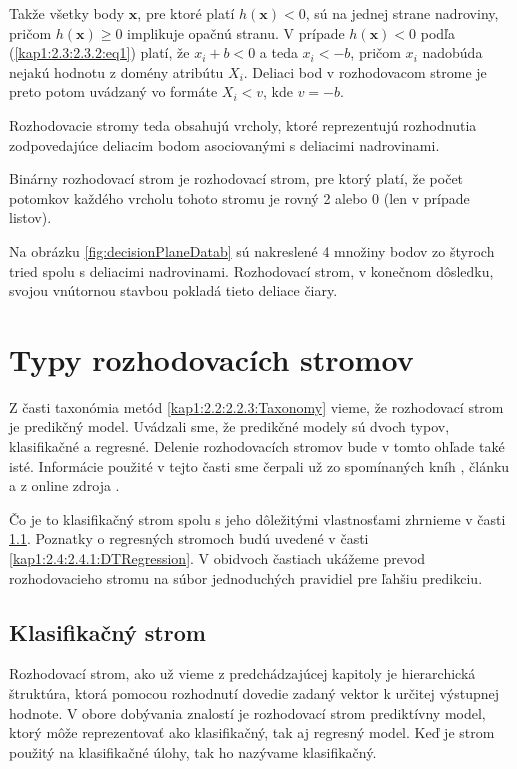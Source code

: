 \begin{remark-sk}\label{kap1:2.3:2.3.2:remarkSplitPoints}
Takže všetky body $\mathbf{x}$, pre ktoré platí $h(\mathbf{x}) < 0$, sú na jednej strane nadroviny, pričom $h(\mathbf{x}) \geq 0$ implikuje opačnú stranu. V prípade $h(\mathbf{x}) < 0$ podľa (\ref{kap1:2.3:2.3.2:eq1}) platí, že $x_{i} + b < 0$ a teda $x_{i} < -b$, pričom $x_{i}$ nadobúda nejakú hodnotu z domény atribútu $X_{i}$. Deliaci bod v rozhodovacom strome je preto potom uvádzaný vo formáte $X_{i} < v$, kde $v = -b$.
\end{remark-sk}

Rozhodovacie stromy teda obsahujú vrcholy, ktoré reprezentujú rozhodnutia zodpovedajúce deliacim bodom asociovanými s deliacimi nadrovinami.

\begin{def-sk}\label{kap1:2.3:2.3.2:binarnyDT}
Binárny rozhodovací strom je rozhodovací strom, pre ktorý platí, že počet potomkov každého vrcholu tohoto stromu je rovný 2 alebo 0 (len v prípade listov).
\end{def-sk}

Na obrázku \ref{fig:decisionPlaneDatab} sú nakreslené 4 množiny bodov zo štyroch tried spolu s deliacimi nadrovinami. Rozhodovací strom, v konečnom dôsledku, svojou vnútornou stavbou pokladá tieto deliace čiary.

\section{Typy rozhodovacích stromov}\label{kap1:2.4:DTTypes}
Z časti taxonómia metód \ref{kap1:2.2:2.2.3:Taxonomy} vieme, že rozhodovací strom je predikčný model.
Uvádzali sme, že predikčné modely sú dvoch typov, klasifikačné a regresné. Delenie rozhodovacích stromov bude v tomto ohľade také isté. Informácie použité v tejto časti sme čerpali už zo spomínaných kníh \cite{kap1-DataMiningForTrees,kap1-DataMiningForMasses}, článku \cite{kap1-DecisionTreesTypes} a z online zdroja \cite{online-DecisionTreeTypes}.

Čo je to klasifikačný strom spolu s jeho dôležitými vlastnosťami zhrnieme v časti \ref{kap1:2.4:2.4.1:DTClassification}. Poznatky o regresných stromoch budú uvedené v časti \ref{kap1:2.4:2.4.1:DTRegression}. V obidvoch častiach ukážeme prevod rozhodovacieho stromu na súbor jednoduchých pravidiel pre ľahšiu predikciu.
\subsection{Klasifikačný strom}\label{kap1:2.4:2.4.1:DTClassification}
Rozhodovací strom, ako už vieme z predchádzajúcej kapitoly je hierarchická štruktúra, ktorá pomocou rozhodnutí dovedie zadaný vektor k určitej výstupnej hodnote. V obore dobývania znalostí je rozhodovací strom prediktívny model, ktorý môže reprezentovať ako klasifikačný, tak aj regresný model. Keď je strom použitý na klasifikačné úlohy, tak ho nazývame klasifikačný.

